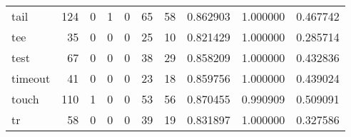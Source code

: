 \begin{longtable}{lrrrrrrrrr}
tail      &                                       124 &                                                  0 &                                                  1 &                                                  0 &                                                 65 &                                                 58 &                                           0.862903 &                               1.000000 &                             0.467742 \\
tee       &                                        35 &                                                  0 &                                                  0 &                                                  0 &                                                 25 &                                                 10 &                                           0.821429 &                               1.000000 &                             0.285714 \\
test      &                                        67 &                                                  0 &                                                  0 &                                                  0 &                                                 38 &                                                 29 &                                           0.858209 &                               1.000000 &                             0.432836 \\
timeout   &                                        41 &                                                  0 &                                                  0 &                                                  0 &                                                 23 &                                                 18 &                                           0.859756 &                               1.000000 &                             0.439024 \\
touch     &                                       110 &                                                  1 &                                                  0 &                                                  0 &                                                 53 &                                                 56 &                                           0.870455 &                               0.990909 &                             0.509091 \\
tr        &                                        58 &                                                  0 &                                                  0 &                                                  0 &                                                 39 &                                                 19 &                                           0.831897 &                               1.000000 &                             0.327586 \\

\end{longtable}
